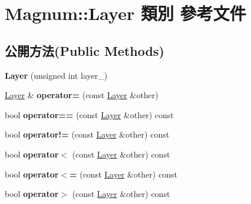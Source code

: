 \hypertarget{class_magnum_1_1_layer}{}\section{Magnum\+:\+:Layer 類別 參考文件}
\label{class_magnum_1_1_layer}
\subsection*{公開方法(Public Methods)}
\begin{DoxyCompactItemize}
\item 
{\bfseries Layer} (unsigned int layer\+\_\+)\hypertarget{class_magnum_1_1_layer_a9536e86d2c19f61711a7b743290cb090}{}\label{class_magnum_1_1_layer_a9536e86d2c19f61711a7b743290cb090}

\item 
\hyperlink{class_magnum_1_1_layer}{Layer} \& {\bfseries operator=} (const \hyperlink{class_magnum_1_1_layer}{Layer} \&other)\hypertarget{class_magnum_1_1_layer_a87d3ea2ca016510f11f604ecbb1a5fb2}{}\label{class_magnum_1_1_layer_a87d3ea2ca016510f11f604ecbb1a5fb2}

\item 
bool {\bfseries operator==} (const \hyperlink{class_magnum_1_1_layer}{Layer} \&other) const \hypertarget{class_magnum_1_1_layer_a8e92c4050c65f0716056ead2596b267a}{}\label{class_magnum_1_1_layer_a8e92c4050c65f0716056ead2596b267a}

\item 
bool {\bfseries operator!=} (const \hyperlink{class_magnum_1_1_layer}{Layer} \&other) const \hypertarget{class_magnum_1_1_layer_a291ed0962dcbfc3d9bb61a7f73032afd}{}\label{class_magnum_1_1_layer_a291ed0962dcbfc3d9bb61a7f73032afd}

\item 
bool {\bfseries operator$<$} (const \hyperlink{class_magnum_1_1_layer}{Layer} \&other) const \hypertarget{class_magnum_1_1_layer_a852fd88c0dc690b456c9c48e4dfa9de5}{}\label{class_magnum_1_1_layer_a852fd88c0dc690b456c9c48e4dfa9de5}

\item 
bool {\bfseries operator$<$=} (const \hyperlink{class_magnum_1_1_layer}{Layer} \&other) const \hypertarget{class_magnum_1_1_layer_a6f28ee4c27eb68b5d2b8f91b8af15499}{}\label{class_magnum_1_1_layer_a6f28ee4c27eb68b5d2b8f91b8af15499}

\item 
bool {\bfseries operator$>$} (const \hyperlink{class_magnum_1_1_layer}{Layer} \&other) const \hypertarget{class_magnum_1_1_layer_aeb9925ef7a43eee5e0477a9596946a26}{}\label{class_magnum_1_1_layer_aeb9925ef7a43eee5e0477a9596946a26}


\end{DoxyCompactItemize}
